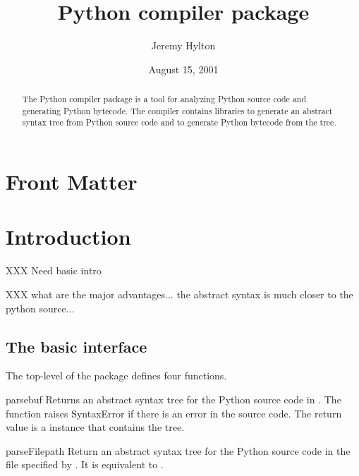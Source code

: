 \documentclass{manual}
\title{Python compiler package}
\author{Jeremy Hylton}
\date{August 15, 2001}           %
\begin{document}
\maketitle

\ifhtml
\chapter*{Front Matter\label{front}}
\fi

%

\begin{abstract}

\noindent
The Python compiler package is a tool for analyzing Python source code
and generating Python bytecode.  The compiler contains libraries to
generate an abstract syntax tree from Python source code and to
generate Python bytecode from the tree.

\end{abstract}

\tableofcontents

\chapter{Introduction\label{Introduction}}

XXX Need basic intro

XXX what are the major advantages...  the abstract syntax is much
closer to the python source...

\section{The basic interface}

The top-level of the package defines four functions.

\begin{funcdesc}{parse}{buf}
Returns an abstract syntax tree for the Python source code in .
The function raises SyntaxError if there is an error in the source
code.  The return value is a  instance that
contains the tree.  
\end{funcdesc}

\begin{funcdesc}{parseFile}{path}
Return an abstract syntax tree for the Python source code in the file
specified by .  It is equivalent to .
\end{funcdesc}
\end{document}
